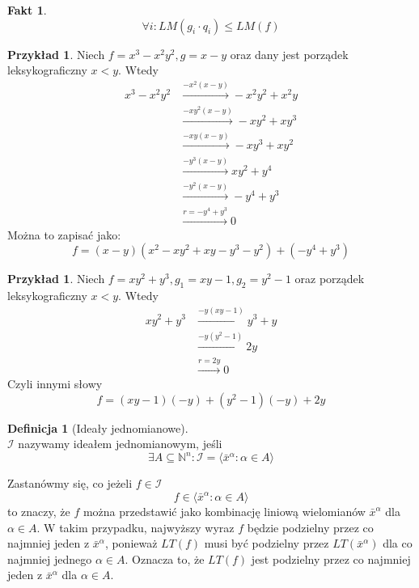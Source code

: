 \documentclass[11pt,a4paper]{article}
\newtheorem{fakt}[twierdzenie]{Fakt}
\theoremstyle{definition}
\newtheorem{definicja}[twierdzenie]{Definicja}
\newtheorem{przyklad}[twierdzenie]{Przykład}
\theoremstyle{remark}
\begin{document}
\begin{fakt}
    \[
        \forall i: LM(g_i \cdot q_i) \leq LM(f)
    \]
\end{fakt}
\begin{przyklad}
    Niech $f = x^3 -x^2 y^2, g = x-y$ oraz dany jest porządek leksykograficzny $x<y$. Wtedy
    \begin{align*}
        x^3 - x^2 y^2 & \xrightarrow{-x^2(x-y)} -x^2 y^2 + x^2 y \\
        & \xrightarrow{-x y^2(x-y)} -x y^2 + x y^3 \\
        & \xrightarrow{-xy(x-y)} -xy^3 + xy^2\\
        & \xrightarrow{-y^3(x-y)} xy^2 + y^4 \\
        & \xrightarrow{-y^2(x-y)}- y^4 + y^3 \\
        & \xrightarrow{r = -y^4 + y^3} 0
    \end{align*}
    Można to zapisać jako:
    \[
        f= (x-y)(x^2 - x y^2 +xy - y^3- y^2) + (-y^4 + y^3)
    \]
\end{przyklad}

\begin{przyklad}
    Niech $f = xy^2 + y^3, g_1 = xy - 1, g_2 = y^2 - 1$ oraz porządek leksykograficzny $x < y$. Wtedy
    \begin{align*}
        xy^2 + y^3 & \xrightarrow{-y(xy - 1)} y^3 + y \\
                   & \xrightarrow{-y(y^2 - 1)} 2y \\
                   & \xrightarrow{r = 2y} 0
    \end{align*}
    Czyli innymi słowy
    \[
        f = (xy - 1)(-y) + (y^2 - 1)(-y) + 2y
    \]
\end{przyklad}

\begin{definicja}[Ideały jednomianowe]~\\
    $\mathcal{I}$ nazywamy ideałem jednomianowym, jeśli 
    \[
        \exists A \subseteq \mathbb{N}^n: \mathcal{I} = \langle \bar{x}^\alpha: \alpha \in A \rangle
    \]
\end{definicja}
Zastanówmy się, co jeżeli $f \in \mathcal{I}$
\[
    f \in \langle \bar{x}^\alpha: \alpha \in A \rangle
\]
to znaczy, że $f$ można przedstawić jako kombinację liniową wielomianów $\bar{x}^\alpha$ dla $\alpha \in A$. W takim przypadku, najwyższy wyraz $f$ będzie podzielny przez co najmniej jeden z $\bar{x}^\alpha$, ponieważ $LT(f)$ musi być podzielny przez $LT(\bar{x}^\alpha)$ dla co najmniej jednego $\alpha \in A$. Oznacza to, że $LT(f)$ jest podzielny przez co najmniej jeden z $\bar{x}^\alpha$ dla $\alpha \in A$.
\end{document}
